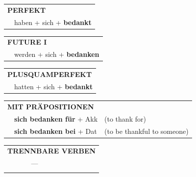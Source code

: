 \documentclass[10pt,a4paper]{revtex4-2}
\begin{document}
\begin{verbbox}
 \begin{tabular}{rl}
     \multicolumn{2}{l}{\textbf{PERFEKT}}\\
    &haben + sich + \textbf{bedankt}\\
  \end{tabular}
\hfill
   \begin{tabular}{rl}
   
    \multicolumn{2}{l}{\textbf{FUTURE I} }\\
    &werden + sich + \textbf{bedanken}\\
 
  \end{tabular}
\hfill
   \begin{tabular}{rl}
      \multicolumn{2}{l}{\textbf{PLUSQUAMPERFEKT}}\\
    &hatten + sich + \textbf{bedankt}\\
  \end{tabular}
  
\vspace{10pt}

   \begin{tabular}{lll}
      \multicolumn{3}{l}{\textbf{MIT PRÄPOSITIONEN}}\\
& \textbf{sich bedanken für} + Akk & (to thank for)\\
& \textbf{sich bedanken bei} + Dat & (to be thankful to someone)
  \end{tabular}
 \hfill
  \begin{tabular}{lll}
     \multicolumn{3}{l}{\textbf{TRENNBARE VERBEN}}\\
     & --- & \\
\vspace{10pt}
  \end{tabular}
  
  \vspace{-5pt}

\end{verbbox}
\end{document}
